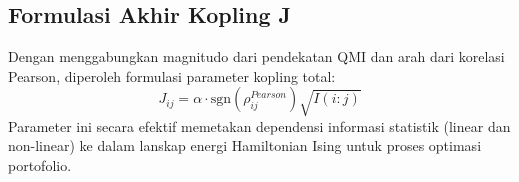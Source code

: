 \subsection{Formulasi Akhir Kopling J}
Dengan menggabungkan magnitudo dari pendekatan QMI dan arah dari korelasi Pearson, diperoleh formulasi parameter kopling total:
\begin{equation}
J_{ij} = \alpha \cdot \text{sgn}(\rho_{ij}^{Pearson}) \sqrt{I(i:j)}
\end{equation}
Parameter ini secara efektif memetakan dependensi informasi statistik (linear dan non-linear) ke dalam lanskap energi Hamiltonian Ising untuk proses optimasi portofolio.
